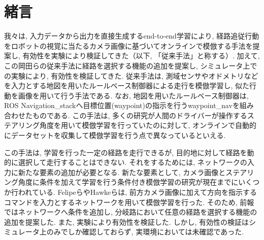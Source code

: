 \documentclass{jarticle}
\begin{document}

\date{} %

\maketitle
\thispagestyle{empty}
\pagestyle{empty}

\small
\section{緒言}%
我々は, 入力データから出力を直接生成するend-to-end学習により, 経路追従行動をロボットの視覚に当たるカメラ画像に基づいてオンラインで模倣する手法を提案し, 有効性を実験により検証してきた\cite{okada1}\cite{okada2}（以下, 「従来手法」と称する）. 加えて, この岡田らの従来手法に経路を選択する機能の追加を提案し, シミュレータ上での実験により, 有効性を検証してきた\cite{mech}. 
従来手法は, 測域センサやオドメトリなどを入力とする地図を用いたルールベース制御器による走行を模倣学習し, 似た行動を画像を用いて行う手法である. なお, 地図を用いたルールベース制御器は, ROS Navigation\_stack\cite{nav}へ目標位置(waypoint)の指示を行うwaypoint\_nav\cite{waypoint}を組み合わせたものである. この手法は, 多くの研究\cite{bojarski}\cite{moridian}\cite{hawke}が人間のドライバーが操作するステアリング角度を用いて模倣学習を行っていたのに対して, オンラインで自動的にデータセットを収集して模倣学習を行う点で異なっているといえる.

この手法は, 学習を行った一定の経路を走行できるが, 目的地に対して経路を動的に選択して走行することはできない. それをするためには, ネットワークの入力に新たな要素の追加が必要となる. 
新たな要素として, カメラ画像とステアリング角度に条件を加えて学習を行う条件付き模倣学習の研究が現在までにいくつか行われている. Felipeら\cite{felipe}やHawkeら\cite{hawke}は, 前方カメラ画像に加えて方向を指示するコマンドを入力とするネットワークを用いて模倣学習を行った. そのため, 前報\cite{mech}ではネットワークへ条件を追加し, 分岐路において任意の経路を選択する機能の追加を提案した. また, 実験により有効性を検証した. しかし, 有効性の検証はシミュレータ上のみでしか確認しておらず, 実環境においては未確認であった. 
\end{document}

